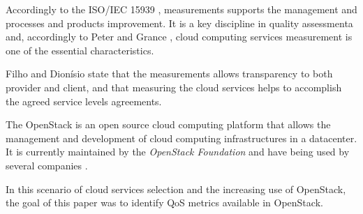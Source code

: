 \documentclass[conference]{IEEEtran}
\begin{document}

Accordingly to the ISO/IEC 15939 \cite{iso15939}, measurements supports the management and processes and products improvement. It is a
key discipline in quality assessmenta and, accordingly to Peter and Grance \cite{mell2011nist}, cloud computing services measurement is 
one of the essential characteristics.


Filho and Dionísio \cite{leite2016influencia} state that the measurements allows transparency to both provider and client, and that measuring the 
cloud services helps to accomplish the agreed service levels agreements.


The OpenStack \cite{openstack_general} is an open source cloud computing platform that allows the management and development of 
cloud computing infrastructures in a datacenter. It is currently maintained by the \textit{OpenStack Foundation} and have being used by several
companies \cite{openstack} \cite{bui2016}.


In this scenario of cloud services selection and the increasing use of OpenStack, the goal of this paper was to identify QoS metrics
available in OpenStack.

\end{document}
